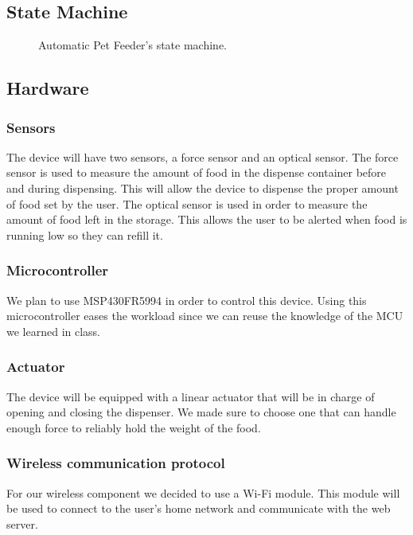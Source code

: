 \documentclass{article}
\begin{document}
\subsection{State Machine}
\begin{figure}[H]
    \centering
    
    \caption{Automatic Pet Feeder's state machine.}
\end{figure}
\subsection{Hardware}
\subsubsection{Sensors}
The device will have two sensors, a force sensor and an optical sensor. The force sensor is used to measure the amount of food in the dispense container before and during dispensing. This will allow the device to dispense the proper amount of food set by the user. The optical sensor is used in order to measure the amount of food left in the storage. This allows the user to be alerted when food is running low so they can refill it.
\subsubsection{Microcontroller}
We plan to use MSP430FR5994 in order to control this device. Using this microcontroller eases the workload since we can reuse the knowledge of the MCU we learned in class.
\subsubsection{Actuator}
The device will be equipped with a linear actuator that will be in charge of opening and closing the dispenser. We made sure to choose one that can handle enough force to reliably hold the weight of the food.
\subsubsection{Wireless communication protocol}
For our wireless component we decided to use a Wi-Fi module. This module will be used to connect to the user's home network and communicate with the web server.
\end{document}
